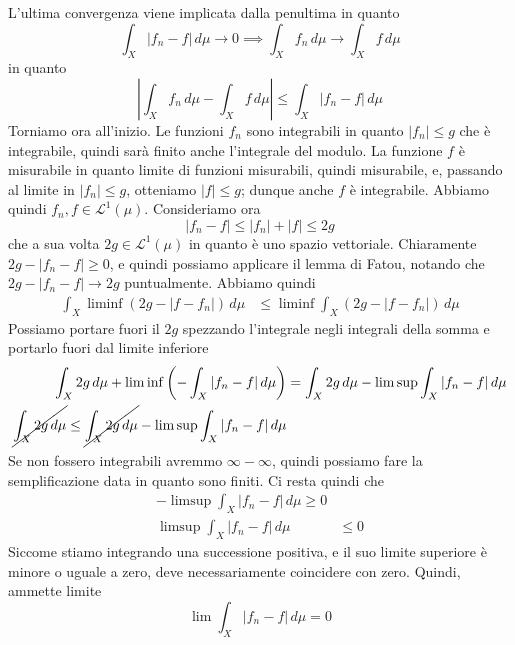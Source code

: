 \documentclass[a4paper]{article}
\begin{document}
\begin{radioactive}
\begin{snippetproof}{}
    L'ultima convergenza viene implicata dalla penultima in quanto
    \[
        \int_X |f_n-f|\,d\mu \to0
        \implies \int_X f_n\,d\mu \to \int_X f\,d\mu
    \]
    in quanto \[
        \left|\int_Xf_n\,d\mu-\int_Xf\,d\mu\right|
        \leq\int_X|f_n-f|\,d\mu
    \]
    Torniamo ora all'inizio.
    Le funzioni \(f_n\) sono integrabili in quanto \(|f_n| \leq g\) che è integrabile, quindi sarà finito anche
    l'integrale del modulo.
    La funzione \(f\) è misurabile in quanto limite di funzioni misurabili, quindi misurabile,
    e, passando al limite in \(|f_n|\leq g\), otteniamo \(|f|\leq g\); dunque anche \(f\) è integrabile.
    Abbiamo quindi \(f_n, f \in \mathcal L^1(\mu)\). Consideriamo ora
    \[
        |f_n - f| \leq |f_n| + |f| \leq 2g
    \]
    che a sua volta \(2g \in \mathcal L^1(\mu)\)
    in quanto è uno spazio vettoriale.
    Chiaramente \(2g - |f_n-f| \geq 0\), e quindi possiamo applicare il lemma di Fatou,
    notando che \(2g - |f_n - f| \to 2g\) puntualmente. Abbiamo quindi
    \begin{align*}
        \int_X \liminf (2g - |f-f_n|)\,d\mu &\leq \liminf
        \int_X (2g - |f-f_n|)\,d\mu
    \end{align*}
    Possiamo portare fuori il \(2g\) spezzando l'integrale negli integrali della somma
    e portarlo fuori dal limite inferiore
    \begin{align*}
        \int_X 2g\,d\mu
        + \liminf \left(
            -\int_X |f_n-f|\,d\mu
        \right)
        &= \int_X 2g\,d\mu - \limsup \int_X |f_n-f|\,d\mu \\
        \cancel{\int_X 2g\,d\mu} \leq \cancel{\int_X 2g\,d\mu} - \limsup \int_X |f_n-f|\,d\mu
    \end{align*}
    Se non fossero integrabili avremmo \(\infty-\infty\),
    quindi possiamo fare la semplificazione data in quanto sono finiti.
    Ci resta quindi che
    \begin{align*}
        -\limsup\int_X|f_n-f|\,d\mu\geq0 \\
        \limsup \int_X |f_n - f|\,d\mu &\leq 0
    \end{align*}
    Siccome stiamo integrando una successione positiva,
    e il suo limite superiore è minore o uguale a zero, deve necessariamente
    coincidere con zero.
    Quindi, ammette limite
    \[
        \lim \int_X |f_n - f|\,d\mu = 0
    \]
\end{snippetproof}
\end{radioactive}
\end{document}
